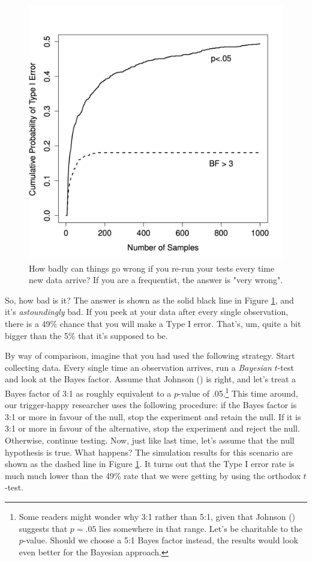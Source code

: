 \documentclass[
  11pt,
  a4paper,
  twoside,symmetric,openright]{book}
\theoremstyle{break}
\theoremstyle{break}
\begin{document}
\begin{figure}

{\centering \includegraphics[width=0.6\linewidth]{resources/image/adapt} 

}

\caption{How badly can things go wrong if you re-run your tests every time new data arrive? If you are a frequentist, the answer is "very wrong".}\label{fig:type1}
\end{figure}

So, how bad is it? The answer is shown as the solid black line in Figure \ref{fig:type1}, and it's \emph{astoundingly} bad. If you peek at your data after every single observation, there is a 49\% chance that you will make a Type I error. That's, um, quite a bit bigger than the 5\% that it's supposed to be.

By way of comparison, imagine that you had used the following strategy. Start collecting data. Every single time an observation arrives, run a \emph{Bayesian} \(t\)-test and look at the Bayes factor. Assume that Johnson () is right, and let's treat a Bayes factor of 3:1 as roughly equivalent to a \(p\)-value of .05.\footnote{Some readers might wonder why 3:1 rather than 5:1, given that Johnson () suggests that \(p=.05\) lies somewhere in that range. Let's be charitable to the \(p\)-value. Should we choose a 5:1 Bayes factor instead, the results would look even better for the Bayesian approach.} This time around, our trigger-happy researcher uses the following procedure: if the Bayes factor is 3:1 or more in favour of the null, stop the experiment and retain the null. If it is 3:1 or more in favour of the alternative, stop the experiment and reject the null. Otherwise, continue testing. Now, just like last time, let's assume that the null hypothesis is true. What happens? The simulation results for this scenario are shown as the dashed line in Figure \ref{fig:type1}. It turns out that the Type I error rate is much much lower than the 49\% rate that we were getting by using the orthodox \(t\)-test.
\end{document}
